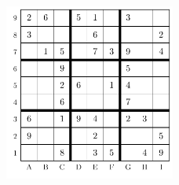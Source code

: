 \begin{figure}[h]
\centering
\includegraphics[width=0.5\textwidth]{sudoku-fig.pdf}
%
%
%
%

\end{figure}
